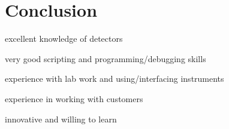 \section{Conclusion}
%
\begin{conclusion}
  \begin{tbox}[.7]
    \item excellent knowledge of detectors
    \item very good scripting and programming/debugging skills
    \item experience with lab work and using/interfacing instruments
    \item experience in working with customers
    \item innovative and willing to learn
  \end{tbox}
\end{conclusion}
%
